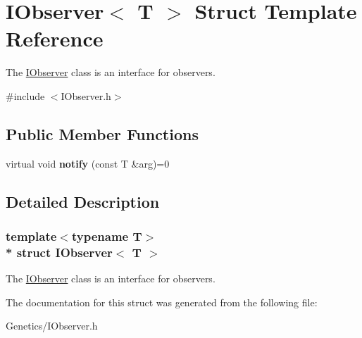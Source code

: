 \hypertarget{struct_i_observer}{}\section{I\+Observer$<$ T $>$ Struct Template Reference}
\label{struct_i_observer}


The \hyperlink{struct_i_observer}{I\+Observer} class is an interface for observers.  




{\ttfamily \#include $<$I\+Observer.\+h$>$}

\subsection*{Public Member Functions}
\begin{DoxyCompactItemize}
\item 
virtual void {\bfseries notify} (const T \&arg)=0\hypertarget{struct_i_observer_a218fcc53f11b591e002c7f3552b26a78}{}\label{struct_i_observer_a218fcc53f11b591e002c7f3552b26a78}

\end{DoxyCompactItemize}


\subsection{Detailed Description}
\subsubsection*{template$<$typename T$>$\\*
struct I\+Observer$<$ T $>$}

The \hyperlink{struct_i_observer}{I\+Observer} class is an interface for observers. 

The documentation for this struct was generated from the following file\+:\begin{DoxyCompactItemize}
\item 
Genetics/I\+Observer.\+h\end{DoxyCompactItemize}
